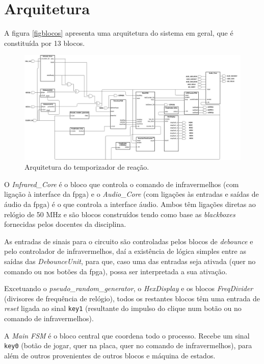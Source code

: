\documentclass[a4paper,11pt,onecolumn]{report}
\begin{document}
\section{Arquitetura}
A figura \autoref{figblocos} apresenta uma arquitetura do sistema em geral, que é constituída por 13 blocos.

\begin{figure}[h]
\centerline{\includegraphics[scale=0.25]{Images/BlockDiagram}}
\caption{Arquitetura do temporizador de reação.}
\label{figblocos}
\end{figure}

O \textit{Infrared\_Core} é o bloco que controla o comando de infravermelhos (com ligação à interface da \ac{fpga}) e o \textit{Audio\_Core} (com ligações às entradas e saídas de áudio da \ac{fpga}) é o que controla a interface áudio. Ambos têm ligações diretas ao relógio de 50 MHz e são blocos construídos tendo como base as \textit{blackboxes} fornecidas pelos docentes da disciplina.

As entradas de sinais para o circuito são controladas pelos blocos de \textit{debounce} e pelo controlador de infravermelhos, daí a existência de lógica simples entre as saídas das \textit{DebounceUnit}, para que, caso uma das entradas seja ativada (quer no comando ou nos botões da \ac{fpga}), possa ser interpretada a sua ativação.

Excetuando o \textit{pseudo\_random\_generator}, o \textit{HexDisplay} e os blocos \textit{FreqDivider} (divisores de frequência de relógio), todos os restantes blocos têm uma entrada de \textit{reset} ligada ao sinal \texttt{key1} (resultante do impulso do clique num botão ou no comando de infravermelhos).

A \textit{Main FSM} é o bloco central que coordena todo o processo. Recebe um sinal \texttt{key0} (botão de jogar, quer na placa, quer no comando de infravermelhos), para além de outros provenientes de outros blocos e máquina de estados. 
\end{document}
